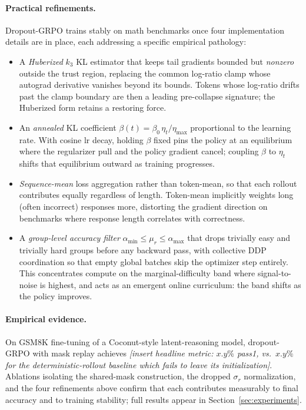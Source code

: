 \paragraph{Practical refinements.}
Dropout-GRPO trains stably on math benchmarks once four implementation
details are in place, each addressing a specific empirical pathology:
\begin{itemize}[topsep=2pt,itemsep=2pt]
\item A \emph{Huberized} $k_3$ KL estimator that keeps tail gradients
      bounded but \emph{nonzero} outside the trust region, replacing the
      common log-ratio clamp whose autograd derivative vanishes beyond
      its bounds.  Tokens whose log-ratio drifts past the clamp boundary
      are then a leading pre-collapse signature; the Huberized form
      retains a restoring force.
\item An \emph{annealed} KL coefficient $\beta(t) = \beta_0\,\eta_t/\eta_{\max}$
      proportional to the learning rate.  With cosine lr decay, holding
      $\beta$ fixed pins the policy at an equilibrium where the
      regularizer pull and the policy gradient cancel; coupling
      $\beta$ to $\eta_t$ shifts that equilibrium outward as training
      progresses.
\item \emph{Sequence-mean} loss aggregation rather than token-mean,
      so that each rollout contributes equally regardless of length.
      Token-mean implicitly weights long (often incorrect) responses
      more, distorting the gradient direction on benchmarks where
      response length correlates with correctness.
\item A \emph{group-level accuracy filter}
      $\alpha_{\min} \le \mu_r \le \alpha_{\max}$ that drops trivially
      easy and trivially hard groups before any backward pass, with
      collective DDP coordination so that empty global batches skip the
      optimizer step entirely.  This concentrates compute on the
      marginal-difficulty band where signal-to-noise is highest, and
      acts as an emergent online curriculum: the band shifts as the
      policy improves.
\end{itemize}

\paragraph{Empirical evidence.}
On \textsc{GSM8K} fine-tuning of a Coconut-style latent-reasoning model,
dropout-GRPO with mask replay achieves \emph{[insert headline metric:
$x.y\%$ pass\@1, vs.\ $x.y\%$ for the deterministic-rollout baseline
which fails to leave its initialization]}.  Ablations isolating the
shared-mask construction, the dropped $\sigma_r$ normalization, and the
four refinements above confirm that each contributes measurably to
final accuracy and to training stability; full results appear in
Section~\ref{sec:experiments}.

